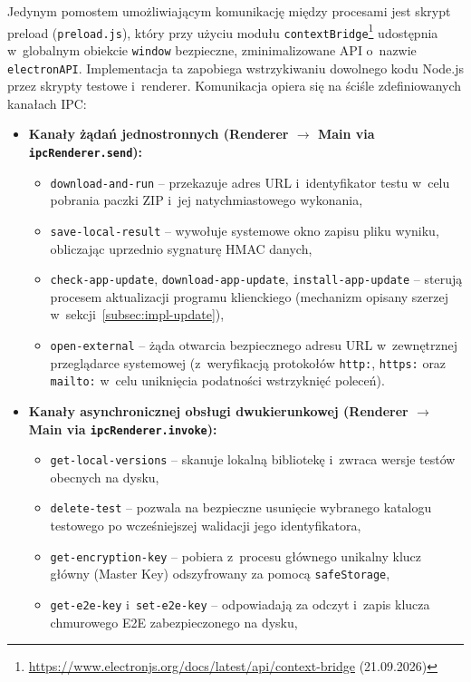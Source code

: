 \documentclass[12pt, a4paper, oneside]{report}
\begin{document}
Jedynym pomostem umożliwiającym komunikację między procesami jest skrypt preload (\texttt{preload.js}), który przy użyciu modułu \texttt{contextBridge}\footnote{\url{https://www.electronjs.org/docs/latest/api/context-bridge} (21.09.2026)} udostępnia w~globalnym obiekcie \texttt{window} bezpieczne, zminimalizowane API o~nazwie \texttt{electronAPI}. Implementacja ta zapobiega wstrzykiwaniu dowolnego kodu Node.js przez skrypty testowe i~renderer. Komunikacja opiera się na ściśle zdefiniowanych kanałach IPC:
\begin{itemize}
	\item \textbf{Kanały żądań jednostronnych (Renderer $\rightarrow$ Main via \texttt{ipcRenderer.send}):}
	      \begin{itemize}
		      \item \texttt{download-and-run} – przekazuje adres URL i~identyfikator testu w~celu pobrania paczki ZIP i~jej natychmiastowego wykonania,
		      \item \texttt{save-local-result} – wywołuje systemowe okno zapisu pliku wyniku, obliczając uprzednio sygnaturę HMAC danych,
		      \item \texttt{check-app-update}, \texttt{download-app-update}, \texttt{install-app-update} – sterują procesem aktualizacji programu klienckiego (mechanizm opisany szerzej w~sekcji~\ref{subsec:impl-update}),
		      \item \texttt{open-external} – żąda otwarcia bezpiecznego adresu URL w~zewnętrznej przeglądarce systemowej (z~weryfikacją protokołów \texttt{http:}, \texttt{https:} oraz \texttt{mailto:} w~celu uniknięcia podatności wstrzyknięć poleceń).
	      \end{itemize}
	\item \textbf{Kanały asynchronicznej obsługi dwukierunkowej (Renderer $\rightarrow$ Main via \texttt{ipcRenderer.invoke}):}
	      \begin{itemize}
		      \item \texttt{get-local-versions} – skanuje lokalną bibliotekę i~zwraca wersje testów obecnych na dysku,
		      \item \texttt{delete-test} – pozwala na bezpieczne usunięcie wybranego katalogu testowego po wcześniejszej walidacji jego identyfikatora,
		      \item \texttt{get-encryption-key} – pobiera z~procesu głównego unikalny klucz główny (Master Key) odszyfrowany za pomocą \texttt{safeStorage},
		      \item \texttt{get-e2e-key} i~\texttt{set-e2e-key} – odpowiadają za odczyt i~zapis klucza chmurowego E2E zabezpieczonego na dysku,

\end{itemize}
\end{itemize}
\end{document}
